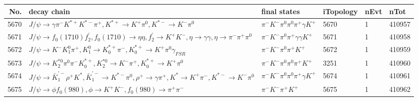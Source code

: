 \begin{table}[htbp] 
\begin{center}
\begin{small}
\begin{tabular}{rlllll}\hline\hline
 No. & decay chain & final states &  iTopology & nEvt & nTot \\\hline
5670&$J/\psi       \rightarrow \gamma       \pi^{-}        K^{*+}         K^{*-}         \pi^{+}        , K^{*+}          \rightarrow K^{+}          \pi^{0}        , K^{*-}          \rightarrow K^{-}          \pi^{0}        $&$\pi^{-}        K^{-}          \pi^{0}        \pi^{0}        \pi^{+}        \gamma       K^{+}          $& 5670&    1&410957\\
5671&$J/\psi       \rightarrow f_{0}(1710)    f_2^{'}       , f_{0}(1710)     \rightarrow \eta          \eta          , f_2^{'}        \rightarrow K^{+}          K^{-}          , \eta           \rightarrow \gamma       \gamma       , \eta           \rightarrow \pi^{-}        \pi^{+}        \pi^{0}        $&$\pi^{-}        K^{-}          \pi^{0}        \pi^{+}        \gamma       \gamma       K^{+}          $& 5671&    1&410958\\
5672&$J/\psi       \rightarrow K^{-}          K_1^{0}        \pi^{+}        , K_1^{0}         \rightarrow K_{0}^{*+}     \pi^{-}        , K_{0}^{*+}      \rightarrow K^{+}          \pi^{0}        \gamma_{FSR} $&$\pi^{-}        K^{-}          \pi^{0}        \pi^{+}        K^{+}          $& 5672&    1&410959\\
5673&$J/\psi       \rightarrow K_2^{*0}       \pi^{0}        \pi^{-}        K_{0}^{*+}     , K_2^{*0}        \rightarrow K^{-}          \pi^{+}        , K_{0}^{*+}      \rightarrow K^{+}          \pi^{0}        $&$\pi^{-}        K^{-}          \pi^{0}        \pi^{0}        \pi^{+}        K^{+}          $& 3251&    1&410960\\
5674&$J/\psi       \rightarrow \bar{K}_1^{'-}\rho^{+}      K^{*}          , \bar{K}_1^{'-} \rightarrow K^{*-}         \pi^{0}        , \rho^{+}       \rightarrow \gamma       \pi^{+}        , K^{*}           \rightarrow K^{+}          \pi^{-}        , K^{*-}          \rightarrow K^{-}          \pi^{0}        $&$\pi^{-}        K^{-}          \pi^{0}        \pi^{0}        \pi^{+}        \gamma       K^{+}          $& 5674&    1&410961\\
5675&$J/\psi       \rightarrow \phi           f_{0}(980)     , \phi            \rightarrow K^{+}          K^{-}          , f_{0}(980)      \rightarrow \pi^{+}        \pi^{-}        $&$\pi^{-}        K^{-}          \pi^{+}        K^{+}          $& 5675&    1&410962\\

\end{tabular}
\end{small}
\end{center}
\end{table}
